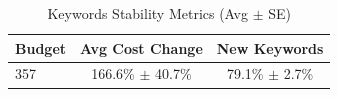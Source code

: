 \begin{table}[htbp]
\centering
\caption{Keywords Stability Metrics (Avg $\pm$ SE)}
\begin{tabular}{lcc}
\toprule
Budget & Avg Cost Change & New Keywords \\
\midrule
357 & 166.6\% $\pm$ 40.7\% & 79.1\% $\pm$ 2.7\% \\
\bottomrule
\end{tabular}
\end{table}